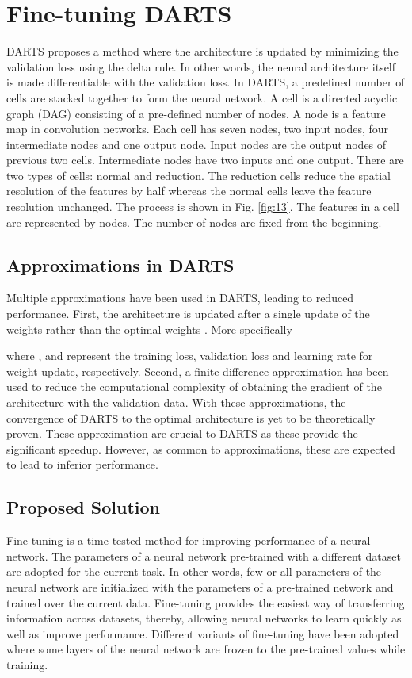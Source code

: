 \documentclass[10pt,a4paper,conference]{IEEEtran}
\begin{document}
\section{Fine-tuning DARTS}
DARTS proposes a method where
the architecture is updated by minimizing the validation loss using the delta rule. In other words, the neural architecture itself is made differentiable with the validation loss.
In DARTS, a predefined number of cells are stacked
together to form the neural network. A cell is a directed
acyclic graph (DAG) consisting of a pre-defined number of
nodes. A node is a feature map in convolution networks.
Each cell has seven nodes, two input nodes, four intermediate
nodes and one output node. Input nodes are the output nodes
of previous two cells. Intermediate nodes have two inputs and one output. There are two types of cells: normal
and reduction. The reduction cells reduce the spatial resolution of the features by half whereas the normal cells leave
the feature resolution unchanged. The process is shown in Fig. \ref{fig:13}. The features in a cell are represented by nodes. The number of nodes are fixed from the beginning. 


\subsection{Approximations in DARTS}
Multiple approximations have been used in DARTS, leading to reduced performance. First, the architecture  is updated after a single update of the weights  rather than the optimal weights . More specifically

where ,  and  represent the training loss, validation loss and learning rate for weight update, respectively.
Second, a finite difference approximation has been used to reduce the computational complexity of obtaining the gradient of the architecture  with the validation data. With these approximations, the convergence of DARTS to the optimal architecture is yet to be theoretically proven. These approximation are crucial to DARTS as these provide the significant speedup. However, as common to approximations, these are expected to lead to inferior performance.
​\subsection{Proposed Solution}
Fine-tuning is a time-tested method for improving performance of a neural network. The parameters of a neural network pre-trained with a different dataset are adopted for the current task. In other words, few or all parameters of the neural network are initialized with the parameters of a pre-trained network and trained over the current data. Fine-tuning provides the easiest way of transferring information across datasets, thereby, allowing neural networks to learn quickly as well as improve performance. Different variants of fine-tuning have been adopted where some layers of the neural network are frozen to the pre-trained values while training.
\end{document}

